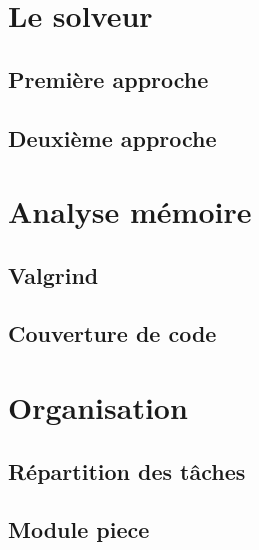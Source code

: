 \documentclass{report}
\begin{document}
\part{Le solveur}
\setcounter{chapter}{0}
\chapter{Première approche}
\chapter{Deuxième approche}



\part{Analyse mémoire}
\setcounter{chapter}{0}
\chapter{Valgrind}

\chapter{Couverture de code}



\part{Organisation}
\setcounter{chapter}{0}
\chapter{Répartition des tâches}

\chapter{Module piece}
\end{document}
